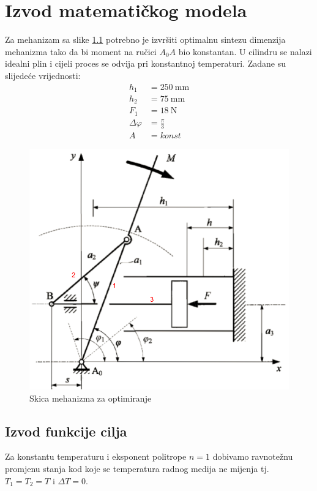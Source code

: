 \chapter{Izvod matematičkog modela}

Za mehanizam sa slike \ref{fig:mehanizma} potrebno je izvršiti optimalnu sintezu dimenzija mehanizma tako da bi moment na ručici $A_0A$ bio konstantan. U cilindru se nalazi idealni plin i cijeli proces se odvija pri konstantnoj temperaturi. Zadane su slijedeće vrijednosti:
\begin{align*}
h_1&=250\ \text{mm}\\
h_2&=75\ \text{mm}\\
F_1&=18\ \text{N}\\
\Delta \varphi &=\frac{\pi}{3}\\
A&=konst
\end{align*}

\begin{figure}[H]
\center
\includegraphics[scale=.4]{slike/mehanizam.png}
\caption{Skica mehanizma za optimiranje}
\label{fig:mehanizma}
\end{figure}

\section{Izvod funkcije cilja}
\quad Za konstantu temperaturu i eksponent politrope $n=1$ dobivamo ravnotežnu promjenu stanja kod koje se temperatura radnog medija ne mijenja tj. $T_1=T_2=T$ i $\Delta T=0$.\\

